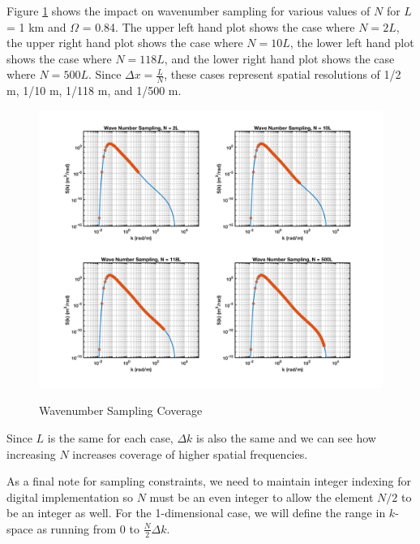 Figure \ref{os_fig:6aa} shows the impact on wavenumber sampling for various values of $N$ for $L$ = 1 km and $\Omega$ = 0.84. The upper left hand plot shows the case where $N = 2L$, the upper right hand plot shows the case where $N = 10L$, the lower left hand plot shows the case where $N = 118L$, and the lower right hand plot shows the case where $N = 500L$. Since $\Delta x = \frac{L}{N}$, these cases represent spatial resolutions of 1/2 m, 1/10 m, 1/118 m, and 1/500 m. 
\begin{figure}[H]
  \begin{center}
\includegraphics[width=6in]{../media/Ocean_Surface/sampling_coverage.png}
  \end{center}
  \renewcommand{\baselinestretch}{1} \small\normalsize
  \begin{quote}
    \caption[Wavenumber Sampling Coverage]{Wavenumber Sampling Coverage\label{os_fig:6aa}}
  \end{quote}
\end{figure}
\renewcommand{\baselinestretch}{2} \small\normalsize
Since $L$ is the same for each case, $\Delta k$ is also the same and we can see how increasing $N$ increases coverage of higher spatial frequencies.

As a final note for sampling constraints, we need to maintain integer indexing for digital implementation so $N$ must be an even integer to allow the element $N/2$ to be an integer as well. For the 1-dimensional case, we will define the range in $k$-space as running from $0$ to $\frac{N}{2}\Delta k$.

